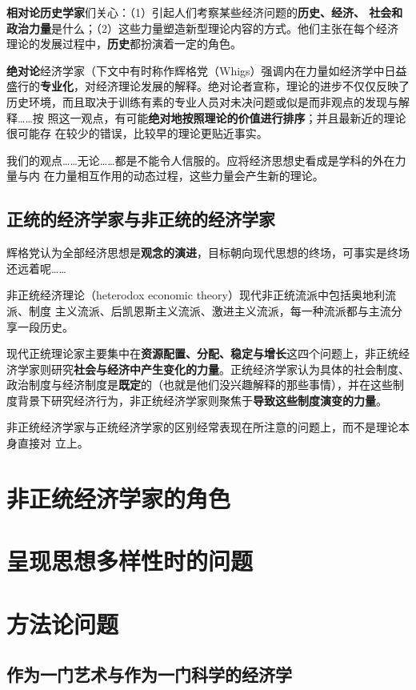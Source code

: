 \textbf{相对论历史学家}们关心：（1）引起人们考察某些经济问题的\textbf{历史、经济、
  社会和政治力量}是什么；（2）这些力量塑造新型理论内容的方式。他们主张在每个经济
理论的发展过程中，\textbf{历史}都扮演着一定的角色。

\textbf{绝对论}经济学家（下文中有时称作辉格党（Whigs）强调内在力量如经济学中日益
盛行的\textbf{专业化}，对经济理论发展的解释。绝对论者宣称，理论的进步不仅仅反映了
历史环境，而且取决于训练有素的专业人员对未决问题或似是而非观点的发现与解释……按
照这一观点，有可能\textbf{绝对地按照理论的价值进行排序}；并且最新近的理论很可能存
在较少的错误，比较早的理论更贴近事实。

我们的观点……无论……都是不能令人信服的。应将经济思想史看成是学科的外在力量与内
在力量相互作用的动态过程，这些力量会产生新的理论。

\subsection{正统的经济学家与非正统的经济学家}

辉格党认为全部经济思想是\textbf{观念的演进}，目标朝向现代思想的终场，可事实是终场
还远着呢……

非正统经济理论（heterodox economic theory）现代非正统流派中包括奥地利流派、制度
主义流派、后凯恩斯主义流派、激进主义流派，每一种流派都与主流分享一段历史。

现代正统理论家主要集中在\textbf{资源配置、分配、稳定与增长}这四个问题上，非正统经
济学家则研究\textbf{社会与经济中产生变化的力量}。正统经济学家认为具体的社会制度、
政治制度与经济制度是\textbf{既定}的（也就是他们没兴趣解释的那些事情），并在这些制
度背景下研究经济行为，非正统经济学家则聚焦于\textbf{导致这些制度演变的力量}。

非正统经济学家与正统经济学家的区别经常表现在所注意的问题上，而不是理论本身直接对
立上。

\section{非正统经济学家的角色}

\section{呈现思想多样性时的问题}

\section{方法论问题}

\subsection{作为一门艺术与作为一门科学的经济学}

